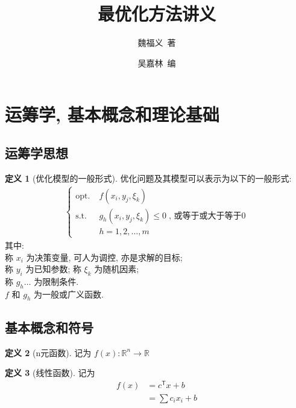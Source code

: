\documentclass{article}
\title{最优化方法讲义}
\author{
  魏福义\ 著
  \and
  吴嘉林\ 编
}
\theoremstyle{definition}
\newtheorem{definition}{定义}[section]
\theoremstyle{theorem}
\newcommand{\Reals}{\mathbb{R}}
\begin{document}

\section{运筹学, 基本概念和理论基础}
\subsection{运筹学思想}


\begin{definition}[优化模型的一般形式] 优化问题及其模型可以表示为以下的一般形式:
\begin{align*}
\begin{cases}
  \text{opt.} \; & f(x_i, y_j, \xi_k) \\
  \text{s.t.} \; & g_h(x_i, y_j, \xi_k) \leq 0 \; \text{, 或等于或大于等于0}\\
                 & h = 1,2,\dots,m
\end{cases}
\end{align*}
其中: \\ 称 \( x_i \) 为决策变量, 可人为调控, 亦是求解的目标; \\ 称 \( y_i \) 为已知参数; 称 \( \xi_k \) 为随机因素; \\ 称 \( g_h \dots \) 为限制条件. \\ \( f \) 和 \( g_h \) 为一般或广义函数.
\end{definition}


\clearpage

\subsection{基本概念和符号}

\begin{definition}[n元函数] 记为
\( f(x): \Reals^n \rightarrow \Reals \)
\end{definition}

\begin{definition}[线性函数] 记为 
\begin{align*}
f(x) &= c^\mathsf{T}x+b \\
     &= \sum c_i x_i + b
\end{align*}
\end{definition}
\end{document}
